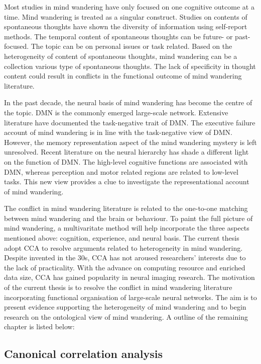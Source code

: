 Most studies in mind wandering have only focused on one cognitive outcome at a time. Mind wandering is treated as a singular construct. Studies on contents of spontaneous thoughts have shown the diversity of information using self-report methods.  The temporal content of spontaneous thoughts can be future- or past-focused. The topic can be on personal issues or task related. Based on the heterogeneity of content of spontaneous thoughts, mind wandering can be a collection various type of spontaneous thoughts. The lack of specificity in thought content could result in conflicts in the functional outcome of mind wandering literature.

In the past decade, the neural basis of mind wandering has become the centre of the topic. DMN is the commonly emerged large-scale network. Extensive literature have documented the task-negative trait of DMN. The executive failure account of mind wandering is in line with the task-negative view of DMN. However, the memory representation aspect of the mind wandering mystery is left unresolved. Recent literature on the neural hierarchy has shade a different light on the function of DMN. The high-level cognitive functions are associated with DMN, whereas perception and motor related regions are related to low-level tasks. This new view provides a clue to investigate the representational account of mind wandering. 

The conflict in mind wandering literature is related to the one-to-one matching between mind wandering and the brain or behaviour. To paint the full picture of mind wandering, a multivaritate method will help incorporate the three aspects mentioned above: cognition, experience, and neural basis. The current thesis adopt CCA to resolve arguments related to heterogeneity in mind wandering. Despite invented in the 30s, CCA has not aroused researchers’ interests due to the lack of practicality. With the advance on computing resource and enriched data size, CCA has gained popularity in neural imaging research. The motivation of the current thesis is to resolve the conflict in mind wandering literature incorporating functional organisation of large-scale neural networks. The aim is to present evidence supporting the heterogeneity of mind wandering and to begin research on the ontological view of mind wandering. A outline of the remaining chapter is listed below: 

\subsection*{Canonical correlation analysis}

